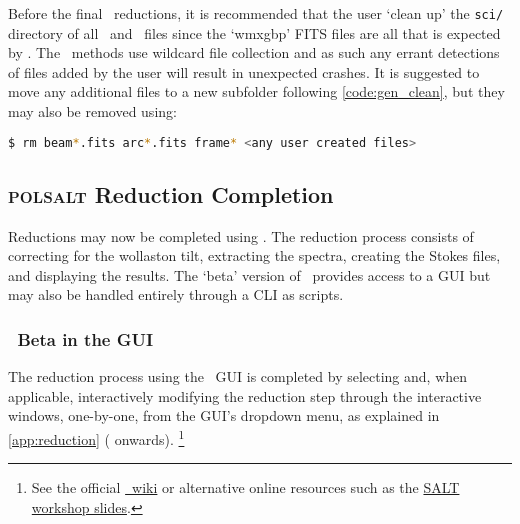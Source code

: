 Before the final \polsalt\ reductions, it is recommended that the user `clean up' the \texttt{sci/} directory of all \iraf\ and \stops\ files since the `wmxgbp' \gls{FITS} files are all that is expected by \polsalt. The \polsalt\ methods use wildcard file collection and as such any errant detections of files added by the user will result in unexpected crashes. It is suggested to move any additional files to a new subfolder following \autoref{code:gen_clean}, but they may also be removed using:
\begin{lstlisting}[language=bash]
$ rm beam*.fits arc*.fits frame* <any user created files>
\end{lstlisting}

\subsection{\textsc{polsalt} Reduction Completion} \label{subsec:reduc_com}

Reductions may now be completed using \polsalt. The reduction process consists of correcting for the wollaston tilt, extracting the spectra, creating the Stokes files, and displaying the results. The `beta' version of \polsalt\ provides access to a \gls{GUI} but may also be handled entirely through a \gls{CLI} as scripts.

\subsubsection{\polsalt\ Beta in the \gls{GUI}}

The reduction process using the \polsalt\ \gls{GUI} is completed by selecting and, when applicable, interactively modifying the reduction step through the interactive windows, one-by-one, from the \gls{GUI}'s dropdown menu, as explained in \autoref{app:reduction} ( onwards).%
\footnote{See the official \href{https://github.com/saltastro/polsalt/wiki}{\polsalt\ wiki} or alternative online resources such as the \href{https://saltworkshop2022.salt.ac.za/wp-content/uploads/2022/11/DG_polsalt_SALT_workshop_2022_finalversion.pdf}{\gls{SALT} workshop slides}.}


